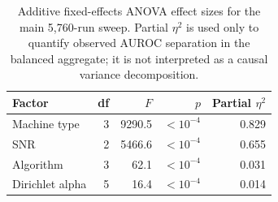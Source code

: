 \begin{table}[t]
\centering
\caption{Additive fixed-effects ANOVA effect sizes for the main 5,760-run sweep. Partial $\eta^2$ is used only to quantify observed AUROC separation in the balanced aggregate; it is not interpreted as a causal variance decomposition.}
\label{tab:p1-factor-effect-sizes}
\scriptsize
\setlength{\tabcolsep}{3pt}
\begin{tabular}{@{}lrrrr@{}}
\toprule
Factor & df & $F$ & $p$ & Partial $\eta^2$ \\
\midrule
Machine type & 3 & 9290.5 & $<10^{-4}$ & 0.829 \\
SNR & 2 & 5466.6 & $<10^{-4}$ & 0.655 \\
Algorithm & 3 & 62.1 & $<10^{-4}$ & 0.031 \\
Dirichlet alpha & 5 & 16.4 & $<10^{-4}$ & 0.014 \\
\bottomrule
\end{tabular}
\end{table}
